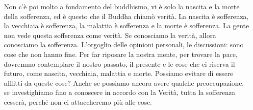 Non c'è poi molto a fondamento del buddhismo, vi è solo la nascita e la
morte della sofferenza, ed è questo che il Buddha chiamò verità. La
nascita è sofferenza, la vecchiaia è sofferenza, la malattia è
sofferenza e la morte è sofferenza. La gente non vede questa sofferenza
come verità. Se conosciamo la verità, allora conosciamo la sofferenza.
L'orgoglio delle opinioni personali, le discussioni: sono cose che non
hanno fine. Per far riposare la nostra mente, per trovare la pace,
dovremmo contemplare il nostro passato, il presente e le cose che ci
riserva il futuro, come nascita, vecchiaia, malattia e morte. Possiamo
evitare di essere afflitti da queste cose? Anche se possiamo ancora
avere qualche preoccupazione, se investighiamo fino a conoscere in
accordo con la Verità, tutta la sofferenza cesserà, perché non ci
attaccheremo più alle cose.

